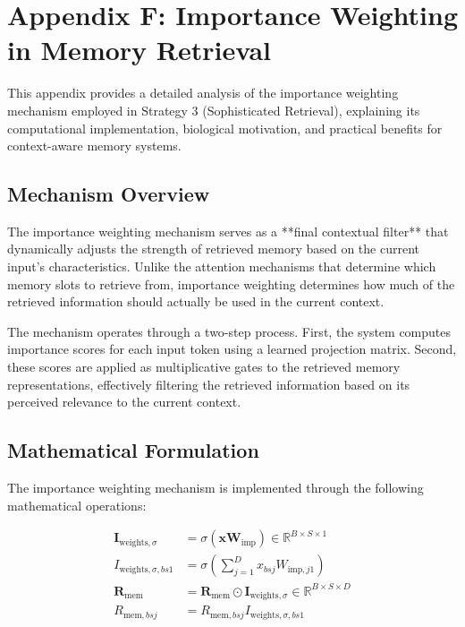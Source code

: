 \documentclass{article}
\begin{document}
\section{Appendix F: Importance Weighting in Memory Retrieval}

This appendix provides a detailed analysis of the importance weighting mechanism employed in Strategy 3 (Sophisticated Retrieval), explaining its computational implementation, biological motivation, and practical benefits for context-aware memory systems.

\subsection{Mechanism Overview}

The importance weighting mechanism serves as a **final contextual filter** that dynamically adjusts the strength of retrieved memory based on the current input's characteristics. Unlike the attention mechanisms that determine which memory slots to retrieve from, importance weighting determines how much of the retrieved information should actually be used in the current context.

The mechanism operates through a two-step process. First, the system computes importance scores for each input token using a learned projection matrix. Second, these scores are applied as multiplicative gates to the retrieved memory representations, effectively filtering the retrieved information based on its perceived relevance to the current context.

\subsection{Mathematical Formulation}

The importance weighting mechanism is implemented through the following mathematical operations:

\begin{align}
\mathbf{I}_{\text{weights},\sigma} &= \sigma(\mathbf{x} \mathbf{W}_{\text{imp}}) \in \mathbb{R}^{B \times S \times 1} \\
I_{\text{weights},\sigma,bs1} &= \sigma\left(\sum_{j=1}^{D} x_{bsj} W_{\text{imp},j1}\right) \\
\mathbf{R}_{\text{mem}} &= \mathbf{R}_{\text{mem}} \odot \mathbf{I}_{\text{weights},\sigma} \in \mathbb{R}^{B \times S \times D} \\
R_{\text{mem},bsj} &= R_{\text{mem},bsj} I_{\text{weights},\sigma,bs1}
\end{align}
\end{document}
